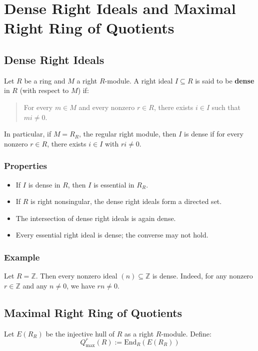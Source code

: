 \documentclass{article}
\begin{document}
\section*{Dense Right Ideals and Maximal Right Ring of Quotients}

\subsection*{Dense Right Ideals}
Let $R$ be a ring and $M$ a right $R$-module. A right ideal $I \subseteq R$ is said to be \textbf{dense} in $R$ (with respect to $M$) if:

\begin{quote}
  For every $m \in M$ and every nonzero $r \in R$, there exists $i \in I$ such that $mi \ne 0$.
\end{quote}

In particular, if $M = R_R$, the regular right module, then $I$ is dense if for every nonzero $r \in R$, there exists $i \in I$ with $ri \ne 0$.

\subsubsection*{Properties}
\begin{itemize}
  \item If $I$ is dense in $R$, then $I$ is essential in $R_R$.
  \item If $R$ is right nonsingular, the dense right ideals form a directed set.
  \item The intersection of dense right ideals is again dense.
  \item Every essential right ideal is dense; the converse may not hold.
\end{itemize}

\subsubsection*{Example}
Let $R = \mathbb{Z}$. Then every nonzero ideal $(n) \subseteq \mathbb{Z}$ is dense. Indeed, for any nonzero $r \in \mathbb{Z}$ and any $n \ne 0$, we have $rn \ne 0$.

\subsection*{Maximal Right Ring of Quotients}

Let $E(R_R)$ be the injective hull of $R$ as a right $R$-module. Define:
\[
Q^r_{\text{max}}(R) := \text{End}_R(E(R_R))
\]
\end{document}
